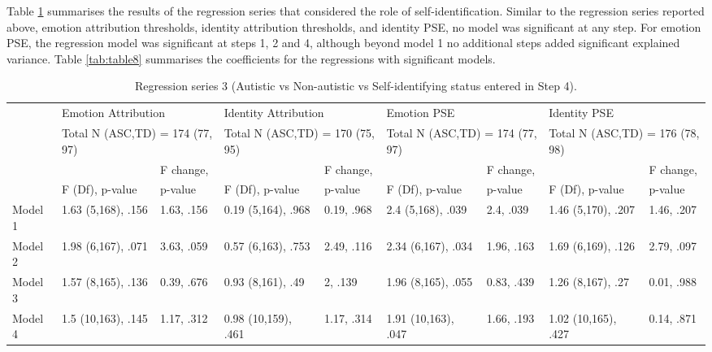 \documentclass[
]{article}
\begin{document}
Table \ref{tab:table7} summarises the results of the regression series that considered the role of self-identification. Similar to the regression series reported above, emotion attribution thresholds, identity attribution thresholds, and identity PSE, no model was significant at any step. For emotion PSE, the regression model was significant at steps 1, 2 and 4, although beyond model 1 no additional steps added significant explained variance. Table \ref{tab:table8} summarises the coefficients for the regressions with significant models.

\begin{table}[H]

\caption{\label{tab:table7}Regression series 3 (Autistic vs Non-autistic vs Self-identifying status entered in Step 4).}
\centering
\fontsize{5}{7}\selectfont
\begin{tabular}[t]{lllllllll}
\toprule
\multicolumn{1}{l}{} & \multicolumn{2}{l}{Emotion Attribution} & \multicolumn{2}{l}{Identity Attribution} & \multicolumn{2}{l}{Emotion PSE} & \multicolumn{2}{l}{Identity PSE} \\
\multicolumn{1}{l}{} & \multicolumn{2}{l}{Total N (ASC,TD) = 174 (77, 97)} & \multicolumn{2}{l}{Total N (ASC,TD) = 170 (75, 95)} & \multicolumn{2}{l}{Total N (ASC,TD) = 174 (77, 97)} & \multicolumn{2}{l}{Total N (ASC,TD) = 176 (78, 98)} \\
\cmidrule(l{3pt}r{3pt}){2-3} \cmidrule(l{3pt}r{3pt}){4-5} \cmidrule(l{3pt}r{3pt}){6-7} \cmidrule(l{3pt}r{3pt}){8-9}
 &  & F change, &  & F change, &  & F change, &  & F change,\\
 & F (Df), p-value & p-value & F (Df), p-value & p-value & F (Df), p-value & p-value & F (Df), p-value & p-value\\
\midrule
Model 1 & 1.63 (5,168), .156 & 1.63, .156 & 0.19 (5,164), .968 & 0.19, .968 & 2.4 (5,168), .039 & 2.4, .039 & 1.46 (5,170), .207 & 1.46, .207\\
Model 2 & 1.98 (6,167), .071 & 3.63, .059 & 0.57 (6,163), .753 & 2.49, .116 & 2.34 (6,167), .034 & 1.96, .163 & 1.69 (6,169), .126 & 2.79, .097\\
Model 3 & 1.57 (8,165), .136 & 0.39, .676 & 0.93 (8,161), .49 & 2, .139 & 1.96 (8,165), .055 & 0.83, .439 & 1.26 (8,167), .27 & 0.01, .988\\
\addlinespace
Model 4 & 1.5 (10,163), .145 & 1.17, .312 & 0.98 (10,159), .461 & 1.17, .314 & 1.91 (10,163), .047 & 1.66, .193 & 1.02 (10,165), .427 & 0.14, .871\\
\bottomrule
\end{tabular}
\end{table}
\end{document}
